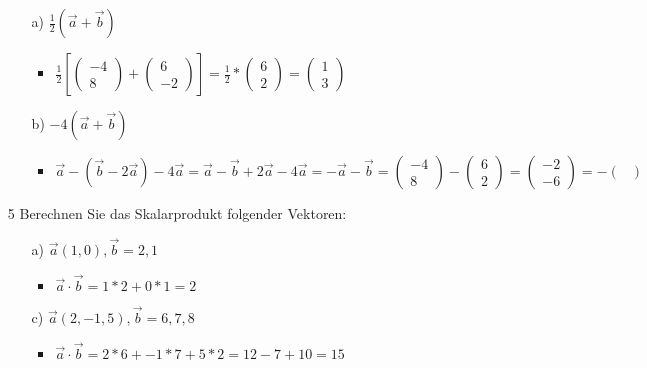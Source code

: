 \documentclass{article}
\begin{document}
\begin{itemize}
		\begin{itemize}
			\item[a)]{$\frac{1}{2}(\vec{a}+\vec{b})$}
			\begin{itemize}
				\item{$\frac{1}{2}[\begin{pmatrix} -4 \\ 8 \end{pmatrix}+\begin{pmatrix} 6 \\ -2 \end{pmatrix}]=\frac{1}{2}*\begin{pmatrix} 6 \\ 2 \end{pmatrix}=\begin{pmatrix} 1 \\ 3 \end{pmatrix}$}
			\end{itemize}
			\item[b)]{$-4(\vec{a}+\vec{b})$}
			\begin{itemize}
				\item{$\vec{a}-(\vec{b}-2 \vec{a}) -4 \vec{a}=\vec{a}-\vec{b}+2 \vec{a}-4 \vec{a}=-\vec{a}-\vec{b}=\begin{pmatrix} -4 \\ 8 \end{pmatrix}-\begin{pmatrix} 6 \\ 2 \end{pmatrix}=\begin{pmatrix} -2 \\ -6 \end{pmatrix}=-\begin{pmatrix}  \\  \end{pmatrix}$}
			\end{itemize}
		\end{itemize}
		\item[5]{Berechnen Sie das Skalarprodukt folgender Vektoren:}
		\begin{itemize}
			\item[a)]{$\vec{a}(1,0), \vec{b}=2,1$}
			\begin{itemize}
				\item{$\vec{a}\cdot\vec{b}=1*2 + 0*1=2$}
			\end{itemize}
			\item[c)]{$\vec{a}(2, -1, 5), \vec{b}=6,7,8$}
			\begin{itemize}
				\item{$\vec{a}\cdot\vec{b}=2*6+-1*7+5*2=12-7+10=15$}

\end{itemize}
\end{itemize}
\end{itemize}
\end{document}
